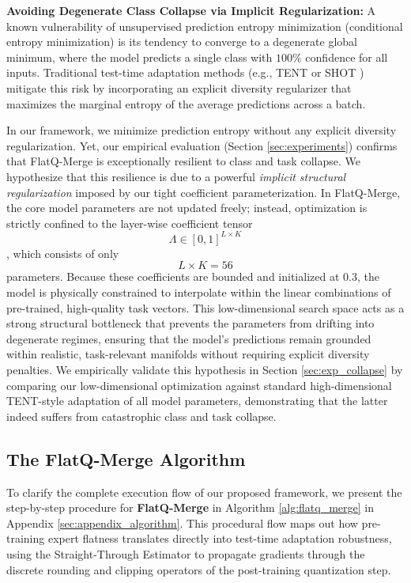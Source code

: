 \textbf{Avoiding Degenerate Class Collapse via Implicit Regularization:} 
A known vulnerability of unsupervised prediction entropy minimization (conditional entropy minimization) is its tendency to converge to a degenerate global minimum, where the model predicts a single class with $100\%$ confidence for all inputs. Traditional test-time adaptation methods (e.g., TENT \cite{Wang2021Tent} or SHOT \cite{Liang2020SHOT}) mitigate this risk by incorporating an explicit diversity regularizer that maximizes the marginal entropy of the average predictions across a batch.

In our framework, we minimize prediction entropy without any explicit diversity regularization. Yet, our empirical evaluation (Section \ref{sec:experiments}) confirms that FlatQ-Merge is exceptionally resilient to class and task collapse. We hypothesize that this resilience is due to a powerful \emph{implicit structural regularization} imposed by our tight coefficient parameterization. In FlatQ-Merge, the core model parameters are not updated freely; instead, optimization is strictly confined to the layer-wise coefficient tensor $$\Lambda \in [0, 1]^{L \times K}$$, which consists of only $$L \times K = 56$$ parameters. Because these coefficients are bounded and initialized at $0.3$, the model is physically constrained to interpolate within the linear combinations of pre-trained, high-quality task vectors. This low-dimensional search space acts as a strong structural bottleneck that prevents the parameters from drifting into degenerate regimes, ensuring that the model's predictions remain grounded within realistic, task-relevant manifolds without requiring explicit diversity penalties. We empirically validate this hypothesis in Section \ref{sec:exp_collapse} by comparing our low-dimensional optimization against standard high-dimensional TENT-style adaptation of all model parameters, demonstrating that the latter indeed suffers from catastrophic class and task collapse.

\subsection{The FlatQ-Merge Algorithm}
To clarify the complete execution flow of our proposed framework, we present the step-by-step procedure for \textbf{FlatQ-Merge} in Algorithm \ref{alg:flatq_merge} in Appendix \ref{sec:appendix_algorithm}. This procedural flow maps out how pre-training expert flatness translates directly into test-time adaptation robustness, using the Straight-Through Estimator to propagate gradients through the discrete rounding and clipping operators of the post-training quantization step.


